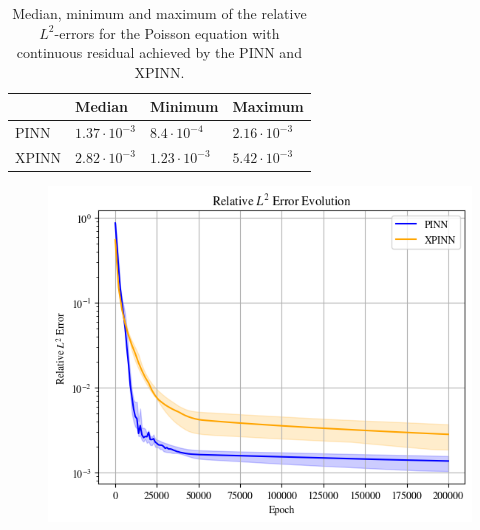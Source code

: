 \begin{table}[h]
\caption{Median, minimum and maximum of the relative $L^2$-errors for the Poisson equation with continuous residual achieved by the PINN and XPINN.}
    \centering
    \begin{tabularx}{\linewidth}{|X|XXX|}
    \hline
     & Median & Minimum & Maximum
    \\
    \hline
    PINN &$1.37\cdot 10^{-3}$ &  $8.4 \cdot 10^{-4}$&$2.16 \cdot 10^{-3}$ 
    \\
    XPINN &$2.82\cdot 10^{-3}$ &  $1.23 \cdot 10^{-3}$&$5.42 \cdot 10^{-3}$
    \\
    \hline
    \end{tabularx}
    \label{table:cont_poisson}
\end{table}
\begin{figure}[h!]
    \centering
    \includegraphics[width = \linewidth]{Project1XPINNs/figures/Poisson/Relative_L2_smooth_Adam.png}
    \caption{}
    \label{fig:rel_l2_smooth_poisson}
\end{figure}

